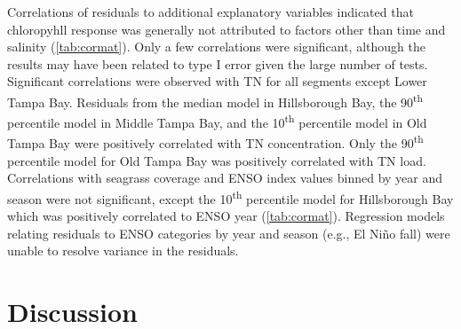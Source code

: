 \documentclass{svjour3}\usepackage[]{graphicx}\usepackage[]{color}
\newcommand{\nine}{90\textsuperscript{th} percentile }
\newcommand{\ten}{10\textsuperscript{th} percentile }
\begin{document}
Correlations of residuals to additional explanatory variables indicated that chloropyhll response was generally not attributed to factors other than time and salinity (\cref{tab:cormat}).  Only a few correlations were significant, although the results may have been related to type I error given the large number of tests.  Significant correlations were observed with \ac{TN} for all segments except Lower Tampa Bay.  Residuals from the median model in Hillsborough Bay, the \nine model in Middle Tampa Bay, and the \ten model in Old Tampa Bay were positively correlated with \ac{TN} concentration.  Only the \nine model for Old Tampa Bay was positively correlated with \ac{TN} load.  Correlations with seagrass coverage and \ac{ENSO} index values binned by year and season were not significant, except the \ten model for Hillsborough Bay which was positively correlated to \ac{ENSO} year (\cref{tab:cormat}).  Regression models relating residuals to \ac{ENSO} categories by year and season (e.g., El Ni\~{n}o fall) were unable to resolve variance in the residuals.  

\section{Discussion}
\end{document}

